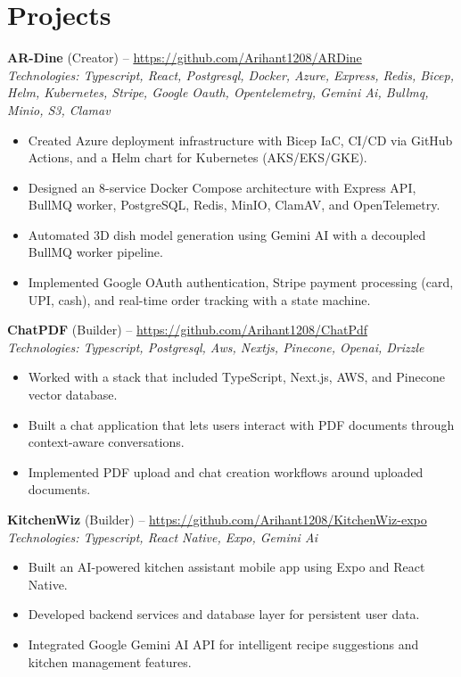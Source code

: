 \documentclass[11pt,a4paper]{article}
\begin{document}
\section{Projects}
\textbf{AR-Dine} (Creator) -- \href{https://github.com/Arihant1208/ARDine}{https://github.com/Arihant1208/ARDine}
\\ \textit{Technologies: Typescript, React, Postgresql, Docker, Azure, Express, Redis, Bicep, Helm, Kubernetes, Stripe, Google Oauth, Opentelemetry, Gemini Ai, Bullmq, Minio, S3, Clamav}
\begin{itemize}
  \item Created Azure deployment infrastructure with Bicep IaC, CI/CD via GitHub Actions, and a Helm chart for Kubernetes (AKS/EKS/GKE).
  \item Designed an 8-service Docker Compose architecture with Express API, BullMQ worker, PostgreSQL, Redis, MinIO, ClamAV, and OpenTelemetry.
  \item Automated 3D dish model generation using Gemini AI with a decoupled BullMQ worker pipeline.
  \item Implemented Google OAuth authentication, Stripe payment processing (card, UPI, cash), and real-time order tracking with a state machine.
\end{itemize}
\vspace{2pt}
\textbf{ChatPDF} (Builder) -- \href{https://github.com/Arihant1208/ChatPdf}{https://github.com/Arihant1208/ChatPdf}
\\ \textit{Technologies: Typescript, Postgresql, Aws, Nextjs, Pinecone, Openai, Drizzle}
\begin{itemize}
  \item Worked with a stack that included TypeScript, Next.js, AWS, and Pinecone vector database.
  \item Built a chat application that lets users interact with PDF documents through context-aware conversations.
  \item Implemented PDF upload and chat creation workflows around uploaded documents.
\end{itemize}
\vspace{2pt}
\textbf{KitchenWiz} (Builder) -- \href{https://github.com/Arihant1208/KitchenWiz-expo}{https://github.com/Arihant1208/KitchenWiz-expo}
\\ \textit{Technologies: Typescript, React Native, Expo, Gemini Ai}
\begin{itemize}
  \item Built an AI-powered kitchen assistant mobile app using Expo and React Native.
  \item Developed backend services and database layer for persistent user data.
  \item Integrated Google Gemini AI API for intelligent recipe suggestions and kitchen management features.
\end{itemize}
\vspace{2pt}
\end{document}
